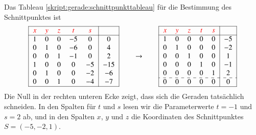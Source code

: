 \begin{beispiel}
{\parindent 0pt Das}
Tableau \eqref{skript:gerade:schnittpunkttableau} für die Bestimmung
des Schnittpunktes ist
\begin{equation*}
\begin{tabular}{|>{$}c<{$}>{$}c<{$}>{$}c<{$}>{$}c<{$}>{$}c<{$}|>{$}c<{$}|}
\hline
\color{red}x&\color{red}y&\color{red}z&\color{red}t&\color{red}s&\\
\hline
1&0&0&-5& 0&0\\
0&1&0&-6& 0&4\\
0&0&1&-1& 0&2\\
1&0&0& 0&-5&-15\\
0&1&0& 0&-2&-6\\
0&0&1& 0&-4&-7\\
\hline
\end{tabular}
\qquad\rightarrow\qquad
\begin{tabular}{|>{$}c<{$}>{$}c<{$}>{$}c<{$}>{$}c<{$}>{$}c<{$}|>{$}c<{$}|}
\hline
\color{red}x&\color{red}y&\color{red}z&\color{red}t&\color{red}s&\\
\hline
1&0&0&0&0&-5\\
0&1&0&0&0&-2\\
0&0&1&0&0&1\\
0&0&0&1&0&-1\\
0&0&0&0&1&2\\
\hdashline
0&0&0&0&0&0\\
\hline
\end{tabular}
\end{equation*}
Die Null in der rechten unteren Ecke zeigt, dass sich die Geraden
tatsächlich schneiden.
In den Spalten für $t$ und $s$ lesen wir die Parameterwerte
$t=-1$ und $s=2$ ab,
und in den Spalten $x$, $y$ und $z$ die Koordinaten des
Schnittpunktes
$S=(-5,-2,1)$.
\end{beispiel}

